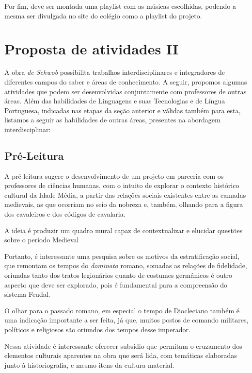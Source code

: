 \documentclass[12pt]{extarticle}
\begin{document}
Por fim, deve ser montada uma playlist com as músicas escolhidas,
podendo a mesma ser divulgada no site do colégio como a playlist do
projeto.

\section{Proposta de atividades II}

A obra \emph{de Schwob} possibilita trabalhos interdisciplinares e
integradores de diferentes campos do saber e áreas de conhecimento. A
seguir, propomos algumas atividades que podem ser desenvolvidas
conjuntamente com professores de outras áreas. Além das habilidades de
Linguagens e suas Tecnologias e de Língua Portuguesa, indicadas nas
etapas da seção anterior e válidas também para esta, listamos a seguir
as habilidades de outras áreas, presentes na abordagem
interdisciplinar:


\subsection{Pré-Leitura}

A pré-leitura sugere o desenvolvimento de um projeto em
parceria com os professores de ciências humanas, com o intuito de
explorar o contexto histórico cultural da Idade Média, a partir das
relações sociais existentes entre as camadas medievais, as que ocorriam
no seio da nobreza e, também, olhando para a figura dos cavaleiros e dos
códigos de cavalaria.

A ideia é produzir um quadro mural capaz de contextualizar e elucidar
questões sobre o período Medieval

Portanto, é interessante uma pesquisa sobre os motivos da estratificação
social, que remontam os tempos do \emph{dominato} romano, somadas as
relações de fidelidade, oriundas tanto dos tratos legionários quanto de
costumes germânicos é outro aspecto que deve ser explorado, pois é
fundamental para a compreensão do sistema Feudal.

O olhar para o passado romano, em especial o tempo de Diocleciano também
é uma indicação importante a ser feita, já que, muitos postos de comando
militares, políticos e religiosos são oriundos dos tempos desse
imperador.

Nessa atividade é interessante oferecer subsídio que permitam o
cruzamento dos elementos culturais aparentes na obra que será lida, com
temáticas elaboradas junto à historiografia, e mesmo itens da cultura
material.
\end{document}

